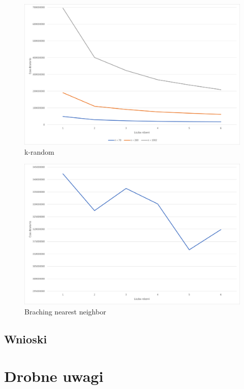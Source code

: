 \documentclass{article}
\begin{document}
\begin{figure}[H]
\includegraphics[scale=0.65]{k_random_parallel.png}
\caption{k-random}
\end{figure}

\begin{figure}[H]
\includegraphics[scale=0.65]{nearest_neighbor_parallel.png}
\caption{Braching nearest neighbor}
\end{figure}

\subsection{Wnioski}

\section*{Drobne uwagi}
\end{document}
